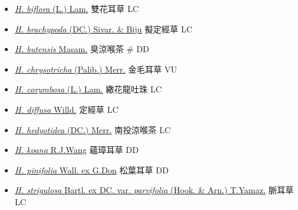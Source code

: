 \begin{itemize}
  \begin{itemize}
        \item[] \href{http://www.theplantlist.org/tpl1.1/search?q=Hedyotis+biflora}{\textit{H. biflora} (L.) Lam.}   雙花耳草   LC
        \item[] \href{http://www.theplantlist.org/tpl1.1/search?q=Hedyotis+brachypoda}{\textit{H. brachypoda} (DC.) Sivar. \& Biju}   擬定經草   LC
        \item[] \href{http://www.theplantlist.org/tpl1.1/search?q=Hedyotis+butensis}{\textit{H. butensis} Masam.}   臭涼喉茶  \# DD
        \item[] \href{http://www.theplantlist.org/tpl1.1/search?q=Hedyotis+chrysotricha}{\textit{H. chrysotricha} (Palib.) Merr.}   金毛耳草   VU
        \item[] \href{http://www.theplantlist.org/tpl1.1/search?q=Hedyotis+corymbosa}{\textit{H. corymbosa} (L.) Lam.}   繖花龍吐珠   LC
        \item[] \href{http://www.theplantlist.org/tpl1.1/search?q=Hedyotis+diffusa}{\textit{H. diffusa} Willd.}   定經草   LC
        \item[] \href{http://www.theplantlist.org/tpl1.1/search?q=Hedyotis+hedyotidea}{\textit{H. hedyotidea} (DC.) Merr.}   南投涼喉茶   LC
        \item[] \href{http://www.theplantlist.org/tpl1.1/search?q=Hedyotis+koana}{\textit{H. koana} R.J.Wang}   蘊璋耳草   DD
        \item[] \href{http://www.theplantlist.org/tpl1.1/search?q=Hedyotis+pinifolia}{\textit{H. pinifolia} Wall. ex G.Don}   松葉耳草   DD
        \item[] \href{http://www.theplantlist.org/tpl1.1/search?q=Hedyotis+strigulosa+var.+parvifolia}{\textit{H. strigulosa} Bartl. ex DC. var. \textit{parvifolia} (Hook. \& Arn.) T.Yamaz.}   脈耳草   LC

\end{itemize}
\end{itemize}
